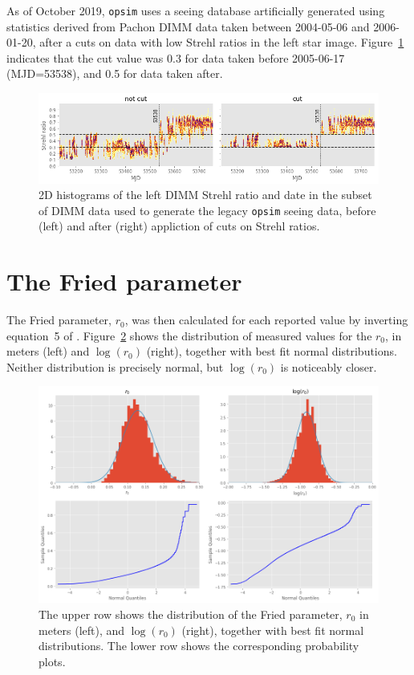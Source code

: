 \documentclass[\docopts]{\docclass}
\begin{document}
As of October 2019, \texttt{opsim} uses a seeing database artificially
generated using statistics derived from Pachon DIMM data taken between
2004-05-06 and 2006-01-20, after a cuts on data with low Strehl ratios
in the left star image. Figure~\ref{fig:claver-strehl-cut} indicates
that the cut value was 0.3 for data taken before 2005-06-17
(MJD=53538), and 0.5 for data taken after.

\begin{figure}
  \includegraphics[width=\columnwidth]{claver_strehl_cut.png}
  \caption{
    2D histograms of the left DIMM Strehl ratio and date in the subset
    of DIMM data used to generate the legacy \texttt{opsim} seeing data, before
    (left) and after (right) appliction of cuts on Strehl ratios.
  }
  \label{fig:claver-strehl-cut}
\end{figure}


\section{The Fried parameter}

The Fried parameter, $r_0$, was then calculated for each reported
value by inverting equation~5 of \cite{2002PASP..114.1156T}.
Figure~\ref{fig:r0-dist} shows the
distribution of measured values for the $r_0$, in meters (left) and
$\log(r_0)$ (right), together with best fit normal
distributions. Neither distribution is precisely normal, but $\log(
r_0)$ is noticeably closer.

\begin{figure}
  \includegraphics[width=\columnwidth]{r0_dist.png}
  \caption{The upper row shows the distribution of the Fried parameter, $r_0$ in meters
    (left), and $\log(r_0)$ (right), together with best fit normal
    distributions. The lower row shows the corresponding
    probability plots.}
  \label{fig:r0-dist}
\end{figure}
\end{document}
